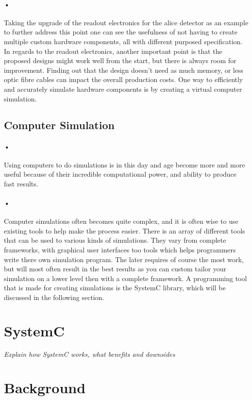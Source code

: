 \documentclass[a4paper]{report}
\begin{document}
\paragraph{•}
Taking the upgrade of the readout electronics for the \gls{alice} detector as an example to further address this point one can see the usefulness of not having to create multiple custom hardware components, all with different purposed specification.
In regards to the readout electronics, another important point is that the proposed designs might work well from the start, but there is always room for improvement. 
Finding out that the design doesn't need as much memory, or less optic fibre cables can impact the overall production costs.
One way to efficiently and accurately simulate hardware components is by creating a virtual computer simulation.

\subsection{Computer Simulation}
\paragraph{•}
Using computers to do simulations is in this day and age become more and more useful because of their incredible computational power, and ability to produce fast results.
\paragraph{•}
Computer simulations often becomes quite complex, and it is often wise to use existing tools to help make the process easier.
There is an array of different tools that can be used to various kinds of simulations.
They vary from complete frameworks, with graphical user interfaces too tools which helps programmers write there own simulation program.
The later requires of course the most work, but will most often result in the best results as you can custom tailor your simulation on a lower level then with a complete framework.
A programming tool that is made for creating simulations is the SystemC library, which will be discussed in the following section.

\section{SystemC}
\textit{Explain how SystemC works, what benefits and downsides}

\section{Background}
\end{document}
